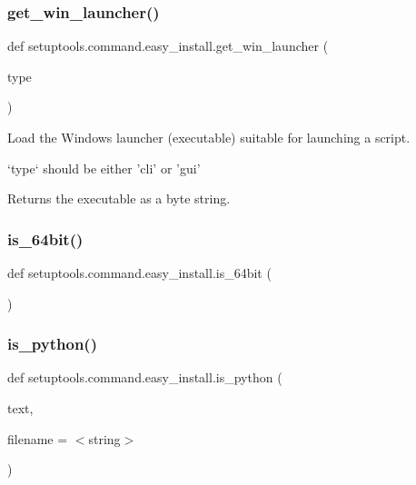 \subsubsection{\texorpdfstring{get\+\_\+win\+\_\+launcher()}{get\_win\_launcher()}}
{\footnotesize\ttfamily def setuptools.\+command.\+easy\+\_\+install.\+get\+\_\+win\+\_\+launcher (\begin{DoxyParamCaption}\item[{}]{type }\end{DoxyParamCaption})}

\begin{DoxyVerb}Load the Windows launcher (executable) suitable for launching a script.

`type` should be either 'cli' or 'gui'

Returns the executable as a byte string.
\end{DoxyVerb}
 \mbox{\label{namespacesetuptools_1_1command_1_1easy__install_aa4ca3a8b2ff550d98b21297547692521}} 
\subsubsection{\texorpdfstring{is\+\_\+64bit()}{is\_64bit()}}
{\footnotesize\ttfamily def setuptools.\+command.\+easy\+\_\+install.\+is\+\_\+64bit (\begin{DoxyParamCaption}{ }\end{DoxyParamCaption})}

\mbox{\label{namespacesetuptools_1_1command_1_1easy__install_acd1aa2f7dd637039467d06ac5ce35a06}} 
\subsubsection{\texorpdfstring{is\+\_\+python()}{is\_python()}}
{\footnotesize\ttfamily def setuptools.\+command.\+easy\+\_\+install.\+is\+\_\+python (\begin{DoxyParamCaption}\item[{}]{text,  }\item[{}]{filename = {\ttfamily \textquotesingle{}$<$string$>$\textquotesingle{}} }\end{DoxyParamCaption})}

